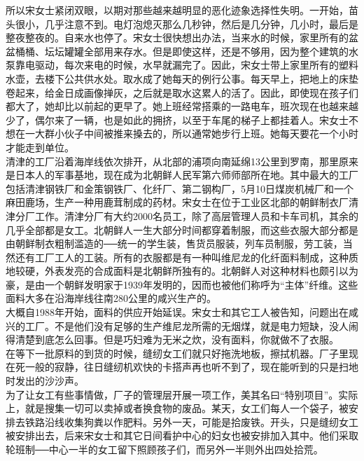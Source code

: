 所以宋女士紧闭双眼，以期对那些越来越明显的恶化迹象选择性失明。一开始，苗头很小，几乎注意不到。电灯泡熄灭那么几秒钟，然后是几分钟，几小时，最后是整夜整夜的。自来水也停了。宋女士很快想出办法，当来水的时候，家里所有的盆盆桶桶、坛坛罐罐全部用来存水。但是即使这样，还是不够用，因为整个建筑的水泵靠电驱动，每次来电的时候，水早就漏完了。因此，宋女士带上家里所有的塑料水壶，去楼下公共供水处。取水成了她每天的例行公事。每天早上，把地上的床垫卷起来，给金日成画像掸灰，之后就是取水这累人的活了。因此，即使现在孩子们都大了，她却比以前起的更早了。她上班经常搭乘的一路电车，班次现在也越来越少了，偶尔来了一辆，也是如此的拥挤，以至于车尾的梯子上都挂着人。宋女士不想在一大群小伙子中间被推来搡去的，所以通常她步行上班。她每天要花一个小时才能走到单位。\\

清津的工厂沿着海岸线依次排开，从北部的浦项向南延绵13公里到罗南，那里原来是日本人的军事基地，现在成为北朝鲜人民军第六师师部所在地。其中最大的工厂包括清津钢铁厂和金策钢铁厂、化纤厂、第二钢构厂，5月10日煤炭机械厂和一个麻田鹿场，生产一种用鹿茸制成的药材。宋女士在位于工业区北部的朝鲜制衣厂清津分厂工作。清津分厂有大约2000名员工，除了高层管理人员和卡车司机，其余的几乎全部都是女工。北朝鲜人一生大部分时间都穿着制服，而这些衣服大部分都是由朝鲜制衣粗制滥造的──统一的学生装，售货员服装，列车员制服，劳工装，当然还有工厂工人的工装。所有的衣服都是有一种叫维尼龙的化纤面料制成，这种质地较硬，外表发亮的合成面料是北朝鲜所独有的。北朝鲜人对这种材料也颇引以为豪，是由一个朝鲜发明家于1939年发明的，因而也被他们称呼为“主体”纤维。这些面料大多在沿海岸线往南280公里的咸兴生产的。\\

大概自1988年开始，面料的供应开始延误。宋女士和其它工人被告知，问题出在咸兴的工厂。不是他们没有足够的生产维尼龙所需的无烟煤，就是电力短缺，没人闹得清楚到底怎么回事。但是巧妇难为无米之炊，没有面料，你就做不了衣服。\\

在等下一批原料的到货的时候，缝纫女工们就只好拖洗地板，擦拭机器。厂子里现在死一般的寂静，往日缝纫机欢快的卡搭声再也听不到了，现在能听到的只是扫地时发出的沙沙声。\\

为了让女工有些事情做，厂子的管理层开展一项工作，美其名曰“特别项目”。实际上，就是搜集一切可以卖掉或者换食物的废品。某天，女工们每人一个袋子，被安排去铁路沿线收集狗粪以作肥料。另外一天，可能是拾废铁。开头，只是缝纫女工被安排出去，后来宋女士和其它日间看护中心的妇女也被安排加入其中。他们采取轮班制──中心一半的女工留下照顾孩子们，而另外一半则外出四处拾荒。\\

